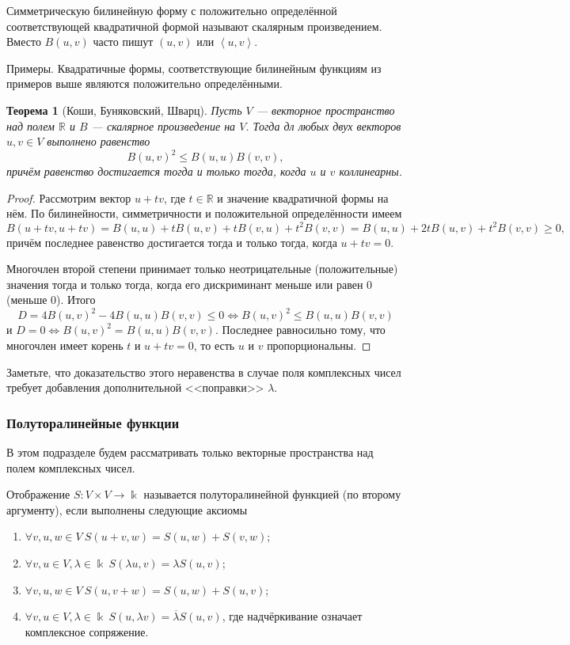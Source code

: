 \documentclass[12pt]{article}
\newtheorem{theorem}{Теорема}
\numberwithin{theorem}{section}
\numberwithin{proposition}{section}
\theoremstyle{definition}
\newcommand{\RR}{\mathbb{R}}
\newcommand{\defin}[2]{\hypertarget{#2}{{\color{red} #1}}}
\begin{document}
	Симметрическую билинейную форму с положительно определённой соответствующей квадратичной формой называют 
	\defin{скалярным произведением}{inner-product}. Вместо $ B(u,v) $ часто пишут $ (u, v) $ или $ \left<u, v\right> $.
	
	Примеры. Квадратичные формы, соответствующие билинейным функциям из примеров выше являются положительно определёнными.
	
	\begin{theorem}[Коши, Буняковский, Шварц] \label{Cauchy-real}
		Пусть $ V $ --- векторное пространство над полем $ \RR $ и $ B $ --- скалярное произведение на $ V $.
		Тогда дл любых двух векторов $ u, v \in V $ выполнено равенство
		$$ B(u, v)^2 \leqslant B(u,u)B(v,v), $$
		причём равенство достигается тогда и только тогда, когда $ u $ и $ v $ коллинеарны.
	\end{theorem}
	
	\begin{proof}
		Рассмотрим вектор $ u + tv $, где $ t \in \RR $ и значение квадратичной формы на нём.
		По билинейности, симметричности и положительной определённости имеем 
		$$ B(u + tv, u + tv) = B(u, u) + tB(u, v) + tB(v, u) + t^2B(v,v) = B(u,u) + 2tB(u,v) + t^2B(v,v) \geqslant 0, $$
		причём последнее равенство достигается тогда и только тогда, когда $ u + tv = 0 $.
		
		Многочлен второй степени принимает только неотрицательные (положительные) значения тогда и только тогда, когда его дискриминант меньше или равен 0 (меньше 0).
		Итого $$ D = 4B(u,v)^2 - 4B(u,u)B(v,v) \leqslant 0  \Leftrightarrow B(u,v)^2 \leqslant B(u,u)B(v,v) $$
		и $ D = 0 \Leftrightarrow B(u,v)^2 = B(u,u)B(v,v) $. Последнее равносильно тому, что многочлен имеет корень $ t $
		и $ u + tv = 0 $, то есть $ u $ и $ v $ пропорциональны.
	\end{proof}
	
	Заметьте, что доказательство этого неравенства в случае поля комплексных чисел требует добавления дополнительной <<поправки>> $ \lambda $.
	
	\subsubsection{Полуторалинейные функции}
	
	В этом подразделе будем рассматривать только векторные пространства над полем комплексных чисел.
	
	Отображение $ S \colon V \times V \to \Bbbk $ называется \defin{полуторалинейной функцией (по второму аргументу)}{sesquilinear}, если выполнены следующие аксиомы
	\begin{enumerate}
		\item $ \forall v,u,w \in V \ S(u + v, w) = S(u, w) + S(v, w) $;
		\item $ \forall v,u \in V, \lambda \in \Bbbk \ S(\lambda u, v) = \lambda S(u, v) $;
		\item $ \forall v,u,w \in V \ S(u, v + w) = S(u, w) + S(u, v) $;
		\item $ \forall v,u \in V, \lambda \in \Bbbk \ S(u, \lambda v) = \overline{\lambda} S(u, v) $,
		где надчёркивание означает комплексное сопряжение.
	\end{enumerate}
	
\end{document}
